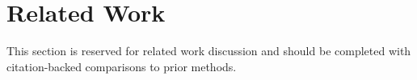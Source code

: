 \section{Related Work}
This section is reserved for related work discussion and should be completed with citation-backed comparisons to prior methods.
